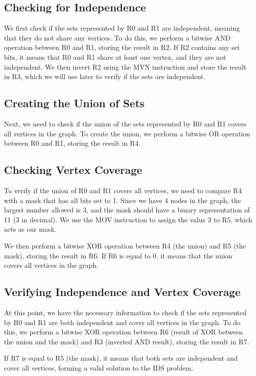 \subsection{Checking for Independence}
We first check if the sets represented by R0 and R1 are independent, meaning that they do not share any vertices. To do this, we perform a bitwise AND operation between R0 and R1, storing the result in R2. If R2 contains any set bits, it means that R0 and R1 share at least one vertex, and they are not independent. We then invert R2 using the MVN instruction and store the result in R3, which we will use later to verify if the sets are independent.

\subsection{Creating the Union of Sets}
Next, we need to check if the union of the sets represented by R0 and R1 covers all vertices in the graph. To create the union, we perform a bitwise OR operation between R0 and R1, storing the result in R4.

\subsection{Checking Vertex Coverage}
To verify if the union of R0 and R1 covers all vertices, we need to compare R4 with a mask that has all bits set to 1. Since we have 4 nodes in the graph, the largest number allowed is 3, and the mask should have a binary representation of 11 (3 in decimal). We use the MOV instruction to assign the value 3 to R5, which acts as our mask.

We then perform a bitwise XOR operation between R4 (the union) and R5 (the mask), storing the result in R6. If R6 is equal to 0, it means that the union covers all vertices in the graph.

\subsection{Verifying Independence and Vertex Coverage}
At this point, we have the necessary information to check if the sets represented by R0 and R1 are both independent and cover all vertices in the graph. To do this, we perform a bitwise XOR operation between R6 (result of XOR between the union and the mask) and R3 (inverted AND result), storing the result in R7.

If R7 is equal to R5 (the mask), it means that both sets are independent and cover all vertices, forming a valid solution to the IDS problem.

